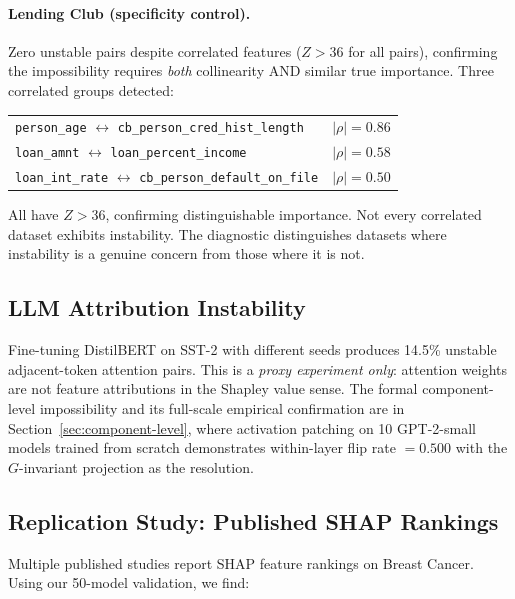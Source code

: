 \documentclass{jmlr}
\begin{document}
\paragraph{Lending Club (specificity control).}
Zero unstable pairs despite correlated features ($Z > 36$ for all pairs), confirming the impossibility requires \emph{both} collinearity AND similar true importance. Three correlated groups detected:

\begin{center}
\footnotesize
\begin{tabular}{@{}ll@{}}
\texttt{person\_age} $\leftrightarrow$ \texttt{cb\_person\_cred\_hist\_length} & $|\rho| = 0.86$ \\
\texttt{loan\_amnt} $\leftrightarrow$ \texttt{loan\_percent\_income} & $|\rho| = 0.58$ \\
\texttt{loan\_int\_rate} $\leftrightarrow$ \texttt{cb\_person\_default\_on\_file} & $|\rho| = 0.50$ \\
\end{tabular}
\end{center}

\noindent All have $Z > 36$, confirming distinguishable importance. Not every correlated dataset exhibits instability. The diagnostic distinguishes datasets where instability is a genuine concern from those where it is not.

\subsection{LLM Attribution Instability}

Fine-tuning DistilBERT on SST-2 with different seeds produces 14.5\% unstable adjacent-token attention pairs. This is a \emph{proxy experiment only}: attention weights are not feature attributions in the Shapley value sense. The formal component-level impossibility and its full-scale empirical confirmation are in Section~\ref{sec:component-level}, where activation patching on 10 GPT-2-small models trained from scratch demonstrates within-layer flip rate $= 0.500$ with the $G$-invariant projection as the resolution.

\subsection{Replication Study: Published SHAP Rankings}

Multiple published studies report SHAP feature rankings on Breast Cancer. Using our 50-model validation, we find:
\end{document}
